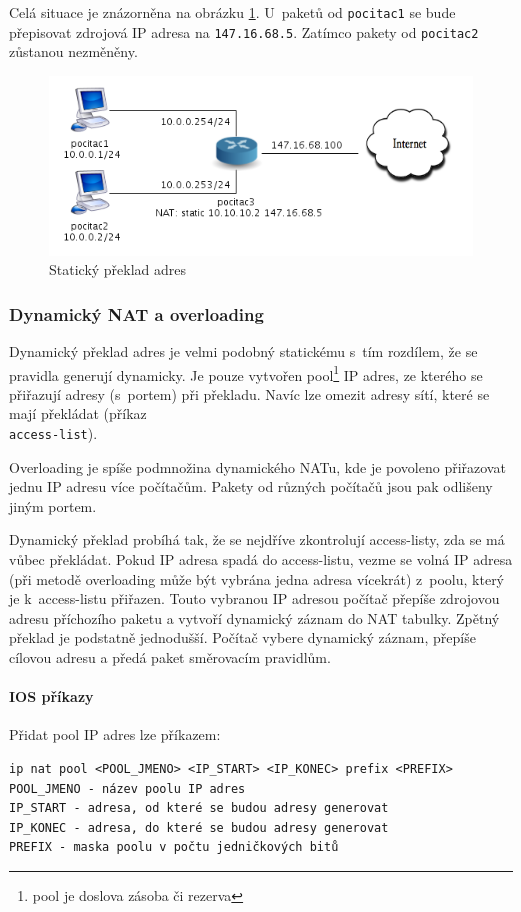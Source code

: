 Celá situace je znázorněna na obrázku \ref{fig:nat1}. U~paketů od \verb|pocitac1| se bude přepisovat zdrojová IP adresa na \verb|147.16.68.5|. Zatímco pakety od \verb|pocitac2| zůstanou nezměněny.

\begin{figure}[h]
\begin{center}
\includegraphics[width=12cm]{figures/nat1}
\caption{Statický překlad adres}
\label{fig:nat1}
\end{center}
\end{figure}

\newpage


\subsubsection{Dynamický NAT a overloading}
Dynamický překlad adres je velmi podobný statickému s~tím rozdílem, že se pravidla generují dynamicky. Je pouze vytvořen pool\footnote{pool je doslova zásoba či rezerva} IP adres, ze kterého se přiřazují adresy (s~portem) při překladu. Navíc lze omezit adresy sítí, které se mají překládat (příkaz \\\verb|access-list|).

Overloading je spíše podmnožina dynamického NATu, kde je povoleno přiřazovat jednu IP adresu více počítačům. Pakety od různých počítačů jsou pak odlišeny jiným portem.

Dynamický překlad probíhá tak, že se nejdříve zkontrolují access-listy, zda se má vůbec překládat. Pokud IP adresa spadá do access-listu, vezme se volná IP adresa (při metodě overloading může být vybrána jedna adresa vícekrát) z~poolu, který je k~access-listu přiřazen. Touto vybranou IP adresou počítač přepíše zdrojovou adresu příchozího paketu a vytvoří dynamický záznam do NAT tabulky. Zpětný překlad je podstatně jednodušší. Počítač vybere dynamický záznam, přepíše cílovou adresu a předá paket směrovacím pravidlům.

\paragraph{IOS příkazy}
Přidat pool IP adres lze příkazem:
\begin{verbatim}
ip nat pool <POOL_JMENO> <IP_START> <IP_KONEC> prefix <PREFIX>
POOL_JMENO - název poolu IP adres
IP_START - adresa, od které se budou adresy generovat
IP_KONEC - adresa, do které se budou adresy generovat
PREFIX - maska poolu v počtu jedničkových bitů
\end{verbatim} 

